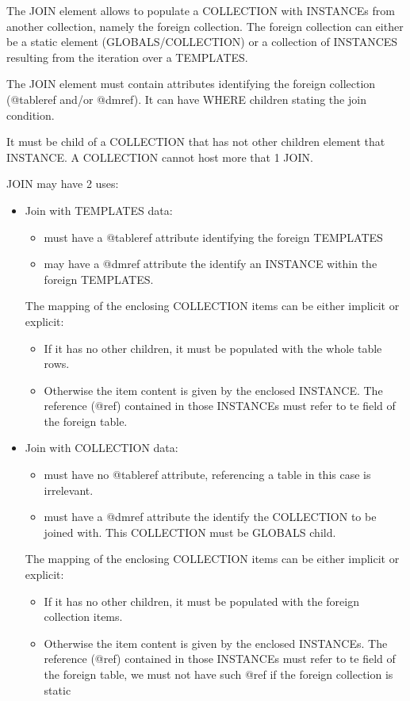 The JOIN element allows to populate a COLLECTION with INSTANCEs from another collection, namely the foreign collection.
The foreign collection can either be a static element (GLOBALS/COLLECTION) or a collection of INSTANCES resulting from the iteration over a TEMPLATES.

The JOIN element must contain attributes identifying the foreign collection  (@tableref and/or @dmref). It can have WHERE children stating the join condition.

It must be child of a COLLECTION that has not other children element that INSTANCE. A COLLECTION cannot host more that 1 JOIN.

JOIN may have 2 uses:

\begin{itemize}

  \item Join with TEMPLATES data:
       \begin{itemize}
         \item must have a @tableref attribute identifying the foreign TEMPLATES
         \item may have a @dmref attribute the identify an INSTANCE within the foreign TEMPLATES.
       \end{itemize}
       The mapping of the enclosing COLLECTION items can be either implicit or explicit:
       \begin{itemize}
         \item If it has no other children, it must be populated with the whole table rows.
         \item Otherwise the item content is given by the enclosed INSTANCE. 
                 The reference (@ref) contained in those INSTANCEs must refer to te field of the foreign table.
       \end{itemize}
       
  \item Join with COLLECTION data:
       \begin{itemize}
         \item must have no @tableref attribute, referencing a table in this case is irrelevant.
         \item must have a @dmref attribute the identify the COLLECTION to be joined with. This COLLECTION must be GLOBALS child.
       \end{itemize}
       The mapping of the enclosing COLLECTION items can be either implicit or explicit:
       \begin{itemize}
         \item If it has no other children, it must be populated with the foreign collection items.
         \item Otherwise the item content is given by the enclosed INSTANCEs. The reference (@ref) contained in those INSTANCEs must refer to te field of the foreign table, we must not have such @ref if the foreign collection is static
       \end{itemize}
           
\end{itemize}

